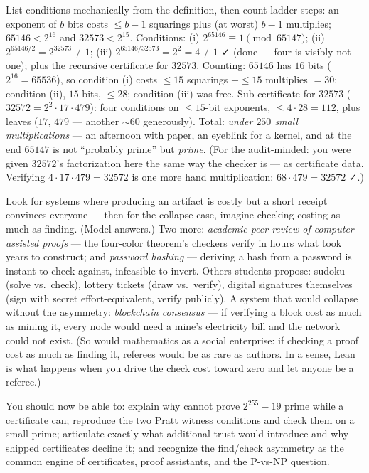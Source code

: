 \pathway List conditions mechanically from the definition, then count
ladder steps: an exponent of $b$ bits costs $\le b-1$ squarings plus (at
worst) $b-1$ multiplies; $65146 < 2^{16}$ and $32573 < 2^{15}$.
\answer Conditions: (i) $2^{65146} \equiv 1 \pmod{65147}$;
(ii) $2^{65146/2} = 2^{32573} \not\equiv 1$;
(iii) $2^{65146/32573} = 2^{2} = 4 \not\equiv 1$ ✓ (done --- four is
visibly not one); plus the recursive certificate for $32573$. Counting:
$65146$ has $16$ bits ($2^{16} = 65536$), so condition (i) costs $\le 15$
squarings $+ \le 15$ multiplies $= 30$; condition (ii), $15$ bits,
$\le 28$; condition (iii) was free. Sub-certificate for $32573$
($32572 = 2^2 \cdot 17 \cdot 479$): four conditions on $\le 15$-bit
exponents, $\le 4 \cdot 28 = 112$, plus leaves ($17$, $479$ ---
another $\sim 60$ generously). Total: \emph{under $250$ small
multiplications} --- an afternoon with paper, an eyeblink for a kernel,
and at the end $65147$ is not ``probably prime'' but \emph{prime}. (For
the audit-minded: you were given $32572$'s factorization here the same
way the checker is --- as certificate data. Verifying
$4 \cdot 17 \cdot 479 = 32572$ is one more hand multiplication:
$68 \cdot 479 = 32572$ ✓.)

\pathway Look for systems where producing an artifact is costly but a
short receipt convinces everyone --- then for the collapse case, imagine
checking costing as much as finding.
\answer (Model answers.) Two more: \emph{academic peer review of
computer-assisted proofs} --- the four-color theorem's checkers verify in
hours what took years to construct; and \emph{password hashing} ---
deriving a hash from a password is instant to check against, infeasible
to invert. Others students propose: sudoku (solve vs.\ check), lottery
tickets (draw vs.\ verify), digital signatures themselves (sign with
secret effort-equivalent, verify publicly). A system that would collapse
without the asymmetry: \emph{blockchain consensus} --- if verifying a
block cost as much as mining it, every node would need a mine's
electricity bill and the network could not exist. (So would mathematics
as a social enterprise: if checking a proof cost as much as finding it,
referees would be as rare as authors. In a sense, Lean is what happens
when you drive the check cost toward zero and let anyone be a referee.)

\begin{checkpoint}
You should now be able to: explain why  cannot prove
$2^{255}-19$ prime while a certificate can; reproduce the two Pratt witness
conditions and check them on a small prime; articulate exactly what
additional trust  would introduce and why shipped
certificates decline it; and recognize the find/check asymmetry as the
common engine of certificates, proof assistants, and the P-vs-NP question.
\end{checkpoint}
